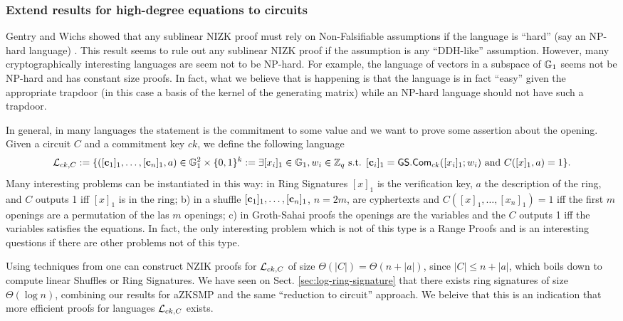 \subsubsection{Extend results for high-degree equations to circuits}
Gentry and Wichs showed that any sublinear NIZK proof must rely on Non-Falsifiable assumptions if the language is ``hard'' (say an NP-hard language) \cite{STOC:GenWic11}. This result seems to rule out any sublinear NIZK proof if the assumption is any ``DDH-like'' assumption. However, many cryptographically interesting languages are seem not to be NP-hard. For example, the language of vectors in a subspace of $\mathbb{G}_1$ seems not be NP-hard and has constant size proofs. In fact, what we believe that is happening is that the language is in fact ``easy'' given the appropriate trapdoor (in this case a basis of the kernel of the generating matrix) while an NP-hard language should not have such a trapdoor.

In general, in many languages the statement is the commitment to some value and we want to prove some assertion about the opening. Given a circuit $C$ and a commitment key $ck$, we define the following language
$$
\mathcal{L}_{ck,C}:= \{([\mathbf{c}_1]_1,\ldots,[\mathbf{c}_n]_1,a)\in\mathbb{G}_1^2\times\{0,1\}^k:= \exists [x_i]_1\in\mathbb{G}_1,w_i\in\mathbb{Z}_q \text{ s.t. } [\mathbf{c}_i]_1={\mathsf{GS}}.\mathsf{Com}_{ck}([x_i]_1;w_i)\text{ and }C([x]_1,a)=1\}.
$$
Many interesting problems can be instantiated in this way: in Ring Signatures $[x]_1$ is the verification key, $a$ the description of the ring, and $C$ outputs 1 iff $[x]_1$ is in the ring; b) in a shuffle $[\mathbf{c}_1]_1,\ldots,[\mathbf{c}_n]_1$, $n=2m$, are cyphertexts and $C([x]_1,\ldots,[x_n]_1)=1$ iff the first $m$ openings are a permutation of the las $m$ openings; c) in Groth-Sahai proofs the openings are the variables and the $C$ outputs 1 iff the variables satisfies the equations. In fact, the only interesting problem which is not of this type is a Range Proofs and is an interesting questions if there are other problems not of this type.

Using techniques from \cite{EC:GroOstSah06} one can construct NZIK proofs for $\mathcal{L}_{ck,C}$ of size $\Theta(|C|)=\Theta(n+|a|)$, since $|C|\leq n+|a|$, which boils down to compute linear Shuffles or Ring Signatures. We have seen on Sect. \ref{sec:log-ring-signature} that there exists ring signatures of size $\Theta(\log n)$, combining our results for aZKSMP and the same ``reduction to circuit'' approach. We beleive that this is an indication that more efficient proofs for languages $\mathcal{L}_{ck,C}$ exists.



